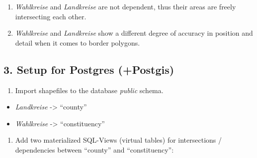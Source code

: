 \begin{enumerate}
\def\labelenumi{\arabic{enumi}.}
\itemsep1pt\parskip0pt
\item
  \emph{Wahlkreise} and \emph{Landkreise} are not dependent, thus their
  areas are freely intersecting each other.
\item
  \emph{Wahlkreise} and \emph{Landkreise} show a different degree of
  accuracy in position and detail when it comes to border polygons.
\end{enumerate}

\subsection{3. Setup for Postgres
(+Postgis)}\label{setup-for-postgres-postgis}

\begin{enumerate}
\def\labelenumi{\arabic{enumi}.}
\itemsep1pt\parskip0pt
\item
  Import shapefiles to the database \emph{public} schema.
\end{enumerate}

\begin{itemize}
\itemsep1pt\parskip0pt
\item
  \emph{Landkreise} -\textgreater{} ``county''
\item
  \emph{Wahlkreise} -\textgreater{} ``constituency''
\end{itemize}

\begin{enumerate}
\def\labelenumi{\arabic{enumi}.}
\setcounter{enumi}{1}
\itemsep1pt\parskip0pt
\item
  Add two materialized SQL-Views (virtual tables) for intersections /
  dependencies between ``county'' and ``constituency'':
\end{enumerate}

